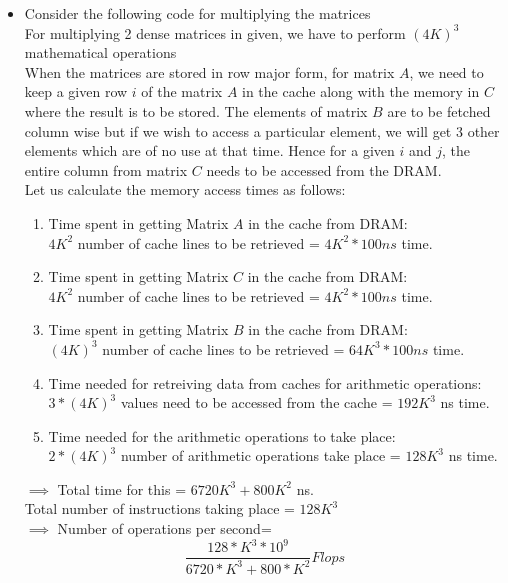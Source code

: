 \documentclass[11pt]{article}
\begin{document}
\begin{enumerate}
\begin{itemize}
		\item Consider the following code for multiplying the matrices \\
				
				For multiplying 2 dense matrices in given, we have to perform $(4K)^3$ mathematical operations \\
				When the matrices are stored in row major form, for matrix $A$, we need to keep a given row $i$ of the matrix $A$ in the cache along with the memory in $C$ where the result is to be stored.
				The elements of matrix $B$ are to be fetched column wise but if we wish to access a particular element, we will get 3 other elements which are of no use at that time.
				Hence for a given $i$ and $j$, the entire column from matrix $C$ needs to be accessed from the DRAM. \\
				Let us calculate the memory access times as follows: \\
				\begin{enumerate}
					\item Time spent in getting Matrix $A$ in the cache from DRAM: \\
							$4K^2$ number of cache lines to be retrieved = $4K^2 * 100ns$ time.
					\item Time spent in getting Matrix $C$ in the cache from DRAM: \\
							$4K^2$ number of cache lines to be retrieved = $4K^2 * 100ns$ time.
					\item Time spent in getting Matrix $B$ in the cache from DRAM: \\
							$(4K)^3$ number of cache lines to be retrieved = $64K^3 * 100ns$ time.
					\item Time needed for retreiving data from caches for arithmetic operations: \\
							$3*(4K)^3$ values need to be accessed from the cache = $192K^3$ ns time. \\
					\item Time needed for the arithmetic operations to take place: \\
							$2*(4K)^3$ number of arithmetic operations take place = $128K^3$ ns time.
				\end{enumerate}
				$\implies$ Total time for this = $6720K^3 + 800K^2$ ns. \\
				Total number of instructions taking place = $128K^3$ \\
				$\implies$ Number of operations per second= \\
				\[
					\frac{128*K^3 * 10^9}{6720*K^3 + 800*K^2} Flops
\]
\end{itemize}
\end{enumerate}
\end{document}
